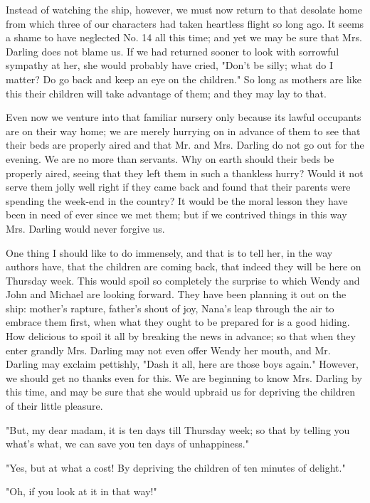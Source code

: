 Instead of watching the ship, however, we must now return to that desolate
home from which three of our characters had taken heartless flight so long
ago. It seems a shame to have neglected No. 14 all this time; and yet we
may be sure that Mrs. Darling does not blame us. If we had returned sooner
to look with sorrowful sympathy at her, she would probably have cried,
"Don't be silly; what do I matter? Do go back and keep an eye on the
children." So long as mothers are like this their children will take
advantage of them; and they may lay to that.


Even now we venture into that familiar nursery only because its lawful
occupants are on their way home; we are merely hurrying on in advance of
them to see that their beds are properly aired and that Mr. and Mrs.
Darling do not go out for the evening. We are no more than servants. Why
on earth should their beds be properly aired, seeing that they left them
in such a thankless hurry? Would it not serve them jolly well right if
they came back and found that their parents were spending the week-end in
the country? It would be the moral lesson they have been in need of ever
since we met them; but if we contrived things in this way Mrs. Darling
would never forgive us.


One thing I should like to do immensely, and that is to tell her, in the
way authors have, that the children are coming back, that indeed they will
be here on Thursday week. This would spoil so completely the surprise to
which Wendy and John and Michael are looking forward. They have been
planning it out on the ship: mother's rapture, father's shout of joy,
Nana's leap through the air to embrace them first, when what they ought to
be prepared for is a good hiding. How delicious to spoil it all by
breaking the news in advance; so that when they enter grandly Mrs. Darling
may not even offer Wendy her mouth, and Mr. Darling may exclaim pettishly,
"Dash it all, here are those boys again." However, we should get no thanks
even for this. We are beginning to know Mrs. Darling by this time, and may
be sure that she would upbraid us for depriving the children of their
little pleasure.


"But, my dear madam, it is ten days till Thursday week; so that by telling
you what's what, we can save you ten days of unhappiness."


"Yes, but at what a cost! By depriving the children of ten minutes of
delight."


"Oh, if you look at it in that way!"


